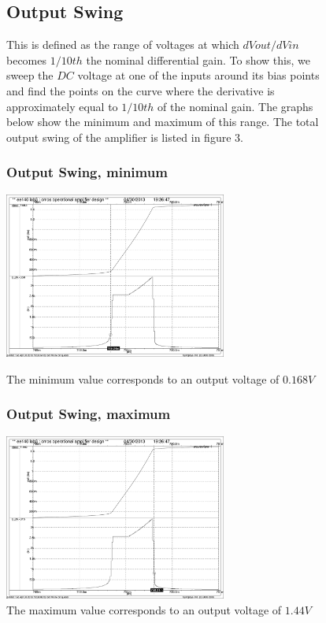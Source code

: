 \documentclass[]{article}
\begin{document}
		\begin{figure}
			\subsection{Output Swing}
			This is defined as the range of voltages at which $dVout/dVin$ becomes $1/10th$ the nominal differential gain. To show this, we sweep the $DC$ voltage at one of the inputs around its bias points and find the points on the curve where the derivative is approximately equal to $1/10th$ of the nominal gain. The graphs below show the minimum and maximum of this range. The total output swing of the amplifier is listed in figure 3.
				\subsubsection{Output Swing, minimum}
				\includegraphics[width=0.65\textwidth]{output_swing.pdf}
				\caption{The minimum value corresponds to an output voltage of $0.168V$}
				\subsubsection{Output Swing, maximum}
				\includegraphics[width=0.65\textwidth]{output_swing_2.pdf}
				\caption{The maximum value corresponds to an output voltage of $1.44V$}

		\end{figure}
		
\end{document}

